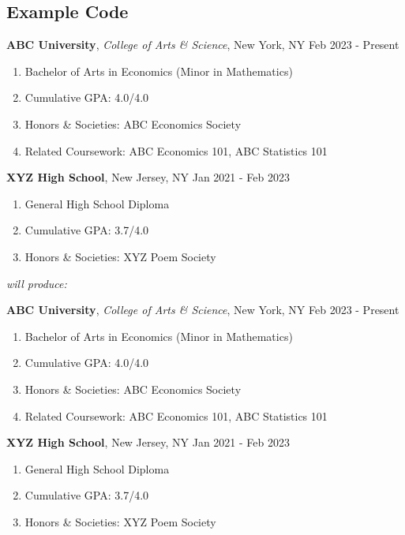 \documentclass[a4paper,10pt]{article}
\begin{document}
\subsection{Example Code}
\begin{codebox}[title=Resume Section Example Code]
\begin{ressection}[Education]
    {\bf ABC University}, {\sl College of Arts \& Science}, New York, NY
    \hfill
    Feb 2023 - Present

    \begin{enumerate}
        \item Bachelor of Arts in Economics (Minor in Mathematics)
        \item Cumulative GPA: 4.0/4.0
        \item Honors \& Societies: ABC Economics Society
        \item Related Coursework: ABC Economics 101, ABC Statistics 101
    \end{enumerate}
    
    \ressep

    {\bf XYZ High School}, New Jersey, NY
    \hfill
    Jan 2021 - Feb 2023
    
    \begin{enumerate}
        \item General High School Diploma
        \item Cumulative GPA: 3.7/4.0
        \item Honors \& Societies: XYZ Poem Society
    \end{enumerate}
\end{ressection}
\end{codebox}

\vspace{1cm}

{\it will produce:}

\vspace{1cm}
\begin{ressection}[Education]
    {\bf ABC University}, {\sl College of Arts \& Science}, New York, NY
    \hfill
    Feb 2023 - Present

    \begin{enumerate}
        \item Bachelor of Arts in Economics (Minor in Mathematics)
        \item Cumulative GPA: 4.0/4.0
        \item Honors \& Societies: ABC Economics Society
        \item Related Coursework: ABC Economics 101, ABC Statistics 101
    \end{enumerate}
    
    \ressep

    {\bf XYZ High School}, New Jersey, NY
    \hfill
    Jan 2021 - Feb 2023
    
    \begin{enumerate}
        \item General High School Diploma
        \item Cumulative GPA: 3.7/4.0
        \item Honors \& Societies: XYZ Poem Society
    \end{enumerate}
\end{ressection}
\end{document}
